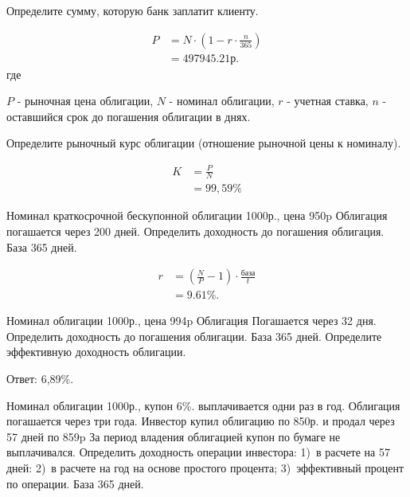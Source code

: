 \documentclass[12pt, table, a4paper,twoside]{exam}
\begin{document}
\begin{questions}
\noaddpoints
\begin{subparts}
	\subpart[8] Определите сумму, которую банк заплатит клиенту.
	\begin{solution}[8em]
		\begin{align}
		P&=N \cdot \left(1 - r \cdot \frac{n}{365} \right)\\
		&= 497945.21\text{р.}\nonumber
		\end{align}
		где
		
		$P$ - рыночная цена облигации, $N$ - номинал облигации, $r$ - учетная ставка, $n$ - оставшийся срок до погашения облигации в днях. 
	\end{solution}
	
	\subpart[2] Определите рыночный курс облигации (отношение рыночной цены к номиналу).
	\begin{solution}[4em]
		\begin{align}
		K&=\frac{P}{N}\\
		&=99,59\%\nonumber
		\end{align}
	\end{solution}
\end{subparts}
\addpoints


\question[10] Номинал краткосрочной бескупонной облигации 1000р., цена 950p Облигация погашается через 200 дней. Определить доходность до погашения облигация. База 365 дней.

\begin{solution}[12em]
	\begin{align}
	r&=\left(\frac{N}{P} -1 \right) \cdot \frac{\text{база}}{t}\\
	&=9.61\%.\nonumber
	\end{align}
\end{solution}

\question[10] Номинал облигации 1000р., цена 994p Облигация Погашается через 32 дня. Определить доходность до погашения облигации. База 365 дней. Определите эффективную доходность облигации.

\begin{solution}[12em]
	
	\raggedright
	Ответ: 6,89\%.
\end{solution}


\question[10] Номинал облигации 1000р., купон 6\%. выплачивается одни раз в год. Облигация погашается через три года. Инвестор купил облигацию по 850р. и продал через 57 дней по 859p За период владения облигацией купон по бумаге не выплачивался. Определить доходность операции инвестора: 1)~в расчете на 57 дней: 2)~в расчете на год на основе простого процента; 3)~эффективный процент по операции. База 365 дней.


\end{questions}
\end{document}
